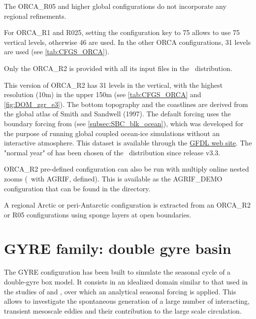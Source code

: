 \documentclass[../main/NEMO_manual]{subfiles}
\begin{document}
The ORCA\_R05 and higher global configurations do not incorporate any regional refinements.

For ORCA\_R1 and R025, setting the configuration key to 75 allows to use 75 vertical levels, otherwise 46 are used.
In the other ORCA configurations, 31 levels are used
(see \autoref{tab:CFGS_ORCA}). %

Only the ORCA\_R2 is provided with all its input files in the \NEMO\ distribution.

This version of ORCA\_R2 has 31 levels in the vertical, with the highest resolution (10m) in the upper 150m
(see \autoref{tab:CFGS_ORCA} and \autoref{fig:DOM_zgr_e3}).
The bottom topography and the coastlines are derived from the global atlas of Smith and Sandwell (1997).
The default forcing uses the boundary forcing from \citet{large.yeager_trpt04} (see \autoref{subsec:SBC_blk_ocean}),
which was developed for the purpose of running global coupled ocean-ice simulations without
an interactive atmosphere.
This \citet{large.yeager_trpt04} dataset is available through
the \href{http://nomads.gfdl.noaa.gov/nomads/forms/mom4/CORE.html}{GFDL web site}.
The "normal year" of \citet{large.yeager_trpt04} has been chosen of the \NEMO\ distribution since release v3.3.

ORCA\_R2 pre-defined configuration can also be run with multiply online nested zooms (\ie\ with AGRIF,  defined).
This is available as the AGRIF\_DEMO configuration that can be found in the  directory.

A regional Arctic or peri-Antarctic configuration is extracted from an ORCA\_R2 or R05 configurations using
sponge layers at open boundaries.

\section{GYRE family: double gyre basin}
\label{sec:CFGS_gyre}

The GYRE configuration \citep{levy.klein.ea_OM10} has been built to
simulate the seasonal cycle of a double-gyre box model.
It consists in an idealized domain similar to that used in the studies of \citet{drijfhout_JPO94} and
\citet{hazeleger.drijfhout_JPO98, hazeleger.drijfhout_JPO99, hazeleger.drijfhout_JGR00, hazeleger.drijfhout_JPO00},
over which an analytical seasonal forcing is applied.
This allows to investigate the spontaneous generation of a large number of interacting, transient mesoscale eddies
and their contribution to the large scale circulation.
\end{document}
